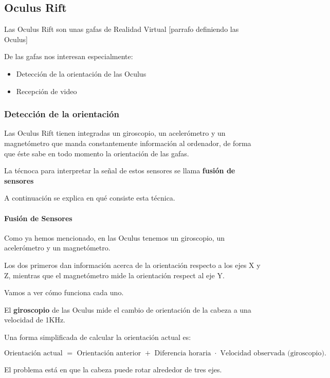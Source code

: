 \documentclass[twoside, 12pt]{epstfg}
\begin{document}
\subsection{Oculus Rift}

Las Oculus Rift son unas gafas de Realidad Virtual [parrafo definiendo las Oculus]

De las gafas nos interesan especialmente:
\begin{itemize}
	\item Detección de la orientación de las Oculus
	\item Recepción de video
\end{itemize}

\subsubsection{Detección de la orientación}



Las Oculus Rift tienen integradas un giroscopio, un acelerómetro y un magnetómetro que manda constantemente información al ordenador, de forma que éste sabe en todo momento la orientación de las gafas.

La técnoca para interpretar la señal de estos sensores se llama \textbf{fusión de sensores}

A continuación se explica en qué consiste esta técnica.

\paragraph{Fusión de Sensores }

Como ya hemos mencionado, en las Oculus tenemos un giroscopio, un acelerómetro y un magnetómetro.

Los dos primeros dan información acerca de la orientación respecto a los ejes X y Z, mientras que el magnetómetro mide la orientación respect al eje Y.

Vamos a ver cómo funciona cada uno.

El \textbf{giroscopio} de las Oculus mide el cambio de orientación de la cabeza a una velocidad de 1KHz.

Una forma simplificada de calcular la orientación actual es:

$$\text{Orientación actual } = \text{ Orientación anterior } + \text{ Diferencia horaria } \cdot \text{ Velocidad observada (giroscopio).}$$

El problema está en que la cabeza puede rotar alrededor de tres ejes.
\end{document}
